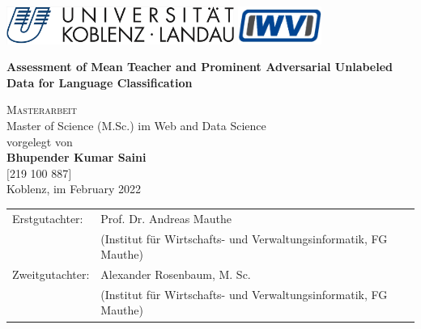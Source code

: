 
\begin{titlepage}
	\includegraphics[height=35pt]{img/uni-logo.png}
	\hfill
	\includegraphics[height=35pt]{img/iwvi.jpg}

	\begin{center}
	\vspace{2.5cm}	
	
	\huge\textbf{Assessment of Mean Teacher and Prominent Adversarial Unlabeled Data for Language Classification}
	


	\normalsize
	\vspace{1.5cm}	

	\textsc{\Large Masterarbeit}\\Master of Science (M.Sc.) im Web and Data Science\\[2cm] 
		
	vorgelegt von\\
	
	\textbf{\Large Bhupender Kumar Saini}\\ $ [ $219 100 887$ ] $\\ [1.5cm] 
	
	Koblenz, im February 2022
	\end{center}
	\vfill
	\begin{tabular}{ll}
		Erstgutachter: & Prof. Dr. Andreas Mauthe\\ 
		 & \small{(Institut f\"ur Wirtschafts- und Verwaltungsinformatik, FG Mauthe)}\\
		Zweitgutachter: & Alexander Rosenbaum, M. Sc. \\ 
		& \small{(Institut f\"ur Wirtschafts- und Verwaltungsinformatik, FG Mauthe)}\\
	\end{tabular}
\end{titlepage}
